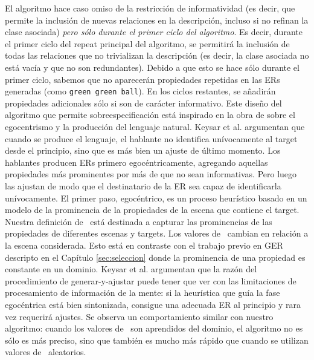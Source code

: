 El algoritmo hace caso omiso de la restricci\'on de informatividad (es decir, que permite la inclusi\'on de nuevas relaciones
en la descripci\'on, incluso si no refinan la clase asociada) \emph{pero s\'olo durante el
primer ciclo del algoritmo}. Es decir, durante el primer ciclo del repeat principal del algoritmo, se permitir\'a la inclusi\'on de todas las relaciones que no trivializan la
descripci\'on (es decir, la clase asociada no est\'a vac\'{i}a y que no son redundantes). Debido a que esto se hace s\'olo durante
el primer ciclo, sabemos que no aparecer\'an propiedades repetidas en las ERs generadas (como \texttt{green green ball}).
En los ciclos restantes, se a\~nadir\'an propiedades adicionales s\'olo si son de car\'acter informativo.
Este dise\~no del algoritmo que permite sobreespecificaci\'on est\'a inspirado en la obra de \cite{keysar:Curr98} sobre el egocentrismo y la producci\'on del lenguaje natural. Keysar et al. argumentan que cuando se produce el lenguaje, el hablante no identifica un\'ivocamente al target desde el principio, sino que  
es m\'as bien un ajuste de \'ultimo momento. Los hablantes producen ERs primero egoc\'entricamente, agregando aquellas propiedades m\'as prominentes por m\'as de que no sean informativas. Pero luego las ajustan de modo que el destinatario de la ER sea capaz de identificarla un\'ivocamente. El primer paso, egoc\'entrico, es un proceso
heur\'istico basado en un modelo de la prominencia de la propiedades de la escena que contiene el target. Nuestra definici\'on de
\puse\ est\'a destinada a capturar las prominencias de las propiedades de diferentes escenas y targets. Los valores de \puse\
cambian en relaci\'on a la escena considerada. Esto est\'a en contraste con el trabajo previo en GER descripto en el Cap\'itulo \ref{sec:seleccion} donde
la prominencia de una propiedad es constante en un dominio. Keysar et al. argumentan que la raz\'on del procedimiento de 
generar-y-ajustar puede tener que ver con las limitaciones de procesamiento de informaci\'on de la
mente: si la heur\'istica que gu\'ia la fase egoc\'entrica est\'a bien sintonizada, consigue una adecuada ER al principio
y rara vez requerir\'a ajustes. Se observa un comportamiento similar
con nuestro algoritmo: cuando los valores de \puse\ son
aprendidos del dominio, el algoritmo no es
s\'olo es m\'as preciso, sino que tambi\'en es mucho m\'as r\'apido que cuando se utilizan valores de \puse\ aleatorios.  


%
%
%
